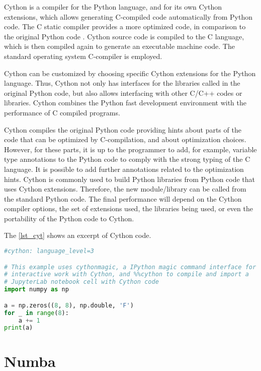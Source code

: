 Cython is a compiler for the Python language, and for its own Cython extensions, which allows generating C-compiled code automatically from Python code. The C static compiler provides a more optimized code, in comparison to the original Python code \cite {Behnel2010}. Cython source code is compiled to the C language, which is then compiled again to generate an executable machine code. The standard operating system C-compiler is employed.

Cython can be customized by choosing specific Cython extensions for the Python language. Thus, Cython not only has interfaces for the libraries called in the original Python code, but also allows interfacing with other C/C++ codes or libraries. Cython combines the Python fast development environment with the performance of C compiled programs.

Cython compiles the original Python code providing hints about parts of the code that can be optimized by C-compilation, and about optimization choices. However, for these parts, it is up to the programmer to add, for example, variable type annotations to the Python code to comply with the strong typing of the C language. It is possible to add further annotations related to the optimization hints. Cython is commonly used to build Python libraries from Python code that uses Cython extensions. Therefore, the new module/library can be called from the standard Python code. The final performance will depend on the Cython compiler options, the set of extensions used, the libraries being used, or even the portability of the Python code to Cython.

The \autoref {lst_cyt} shows an excerpt of Cython code.

\begin{lstlisting}[float=htb, language={Python}, label={lst_cyt}, caption={Excerpt of Cython code.}]
%%cython --force --compile-args=-O3
#cython: language_level=3

# This example uses cythonmagic, a IPython magic command interface for
# interactive work with Cython, and %%cython to compile and import a 
# JupyterLab notebook cell with Cython code
import numpy as np

a = np.zeros((8, 8), np.double, 'F')
for _ in range(8):
    a += 1
print(a)
\end{lstlisting}

%
%
%
\section{Numba}

